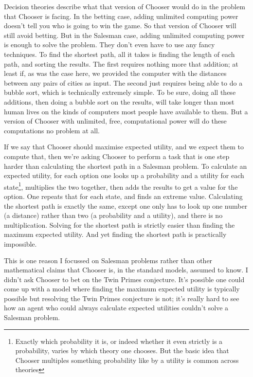 \documentclass[
  10pt,
  letterpaper,
  DIV=11,
  numbers=noendperiod,
  twoside]{scrartcl}
\begin{document}
Decision theories describe what that version of Chooser would do in the
problem that Chooser is facing. In the betting case, adding unlimited
computing power doesn't tell you who is going to win the game. So that
version of Chooser will still avoid betting. But in the Salesman case,
adding unlimited computing power is enough to solve the problem. They
don't even have to use any fancy techniques. To find the shortest path,
all it takes is finding the length of each path, and sorting the
results. The first requires nothing more that addition; at least if, as
was the case here, we provided the computer with the distances between
any pairs of cities as input. The second just requires being able to do
a bubble sort, which is technically extremely simple. To be sure, doing
all these additions, then doing a bubble sort on the results, will take
longer than most human lives on the kinds of computers most people have
available to them. But a version of Chooser with unlimited, free,
computational power will do these computations no problem at all.

If we say that Chooser should maximise expected utility, and we expect
them to compute that, then we're asking Chooser to perform a task that
is one step harder than calculating the shortest path in a Salesman
problem. To calculate an expected utility, for each option one looks up
a probability and a utility for each state\footnote{Exactly which
  probability it is, or indeed whether it even strictly is a
  probability, varies by which theory one chooses. But the basic idea
  that Chooser multiples something probability like by a utility is
  common across theories}, multiplies the two together, then adds the
results to get a value for the option. One repeats that for each state,
and finds an extreme value. Calculating the shortest path is exactly the
same, except one only has to look up one number (a distance) rather than
two (a probability and a utility), and there is no multiplication.
Solving for the shortest path is strictly easier than finding the
maximum expected utility. And yet finding the shortest path is
practically impossible.

This is one reason I focussed on Salesman problems rather than other
mathematical claims that Chooser is, in the standard models, assumed to
know. I didn't ask Chooser to bet on the Twin Primes conjecture. It's
possible one could come up with a model where finding the maximum
expected utility is typically possible but resolving the Twin Primes
conjecture is not; it's really hard to see how an agent who could always
calculate expected utilities couldn't solve a Salesman problem.
\end{document}
